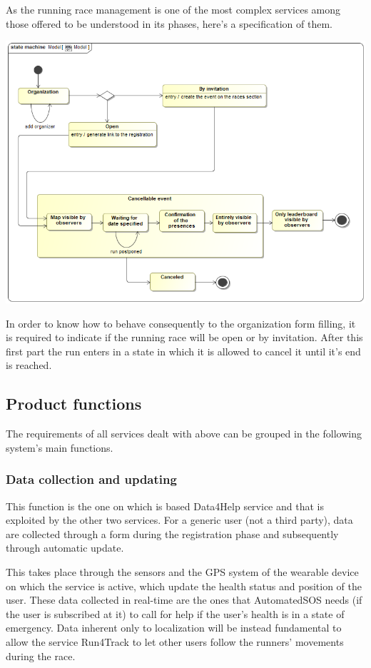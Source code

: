 As the running race management is one of the most complex services among those offered to be understood in its phases, here's a specification of them.

\begin{center}
\includegraphics[scale=0.6]{sections/diagrams/stateDiagram.png} \newline
{}
\end{center}

In order to know how to behave consequently to the organization form filling, it is required to indicate if the running race will be open or by invitation. After this first part the run enters in a state in which it is allowed to cancel it until it's end is reached.

\subsection{Product functions}
The requirements of all services dealt with above can be grouped in the following system's main functions.

\subsubsection{Data collection and updating}
This function is the one on which is based Data4Help service and that is exploited by the other two services. For a generic user (not a third party), data are collected through a form during the registration phase and subsequently through automatic update.

This takes place through the sensors and the GPS system of the wearable device on which the service is active, which update the health status and position of the user. These data collected in real-time are the ones that AutomatedSOS needs (if the user is subscribed at it) to call for help if the user's health is in a state of emergency. Data inherent only to localization will be instead fundamental to allow the service Run4Track to let other users follow the runners' movements during the race.

